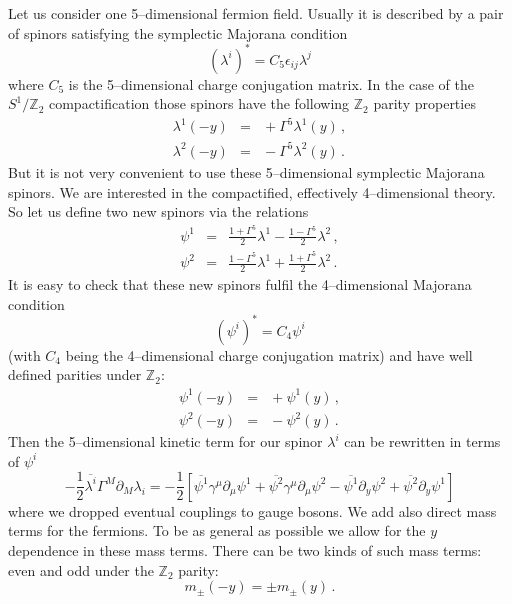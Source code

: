 \documentclass[a4paper,12pt]{article}
\def\pa{\partial}
\def\ga{\gamma}
\def\Ga{\Gamma}
\def\la{\lambda}
\def\eps{\epsilon}
\def\ZZ{\mathbb Z}
\begin{document}
Let us consider one 5--dimensional fermion field.
Usually it is described by a pair of spinors satisfying the symplectic
Majorana condition
\begin{equation}
(\la^i)^*=C_5\eps_{ij}\la^j
\end{equation}
where $C_5$ is the 5--dimensional charge conjugation matrix. In the
case of the $S^1/\ZZ_2$ compactification those spinors have the
following $\ZZ_2$ parity properties
\begin{eqnarray}
\la^1(-y)
\!\!\!&=&\!\!\!
+\Ga^5\la^1(y)
\,,\\[6pt]
\la^2(-y)
\!\!\!&=&\!\!\!
-\Ga^5\la^2(y)
\,.
\end{eqnarray}
But it is not very convenient to use these 5--dimensional symplectic
Majorana spinors. We are interested in the compactified, effectively
4--dimensional theory. So let us define two new spinors via the
relations
\begin{eqnarray}
\psi^1
\!\!\!&=&\!\!\!
\frac{1+\Ga^5}{2}\la^1 - \frac{1-\Ga^5}{2}\la^2
\,,\\[6pt]
\psi^2
\!\!\!&=&\!\!\!
\frac{1-\Ga^5}{2}\la^1 + \frac{1+\Ga^5}{2}\la^2
\,.
\end{eqnarray}
It is easy to check that these new spinors fulfil the 4--dimensional
Majorana condition
\begin{equation}
(\psi^i)^*=C_4\psi^i
\end{equation}
(with $C_4$ being the 4--dimensional charge conjugation matrix) and 
have well defined parities under $\ZZ_2$:
\begin{eqnarray}
\psi^1(-y)
\!\!\!&=&\!\!\!
+\psi^1(y)
\,,\label{psi1parity}
\\[6pt]
\psi^2(-y)
\!\!\!&=&\!\!\!
-\psi^2(y)
\,.\label{psi2parity}
\end{eqnarray}
Then the 5--dimensional kinetic term for our spinor $\la^i$ can be
rewritten in terms of $\psi^i$
\begin{equation}
-\frac12\overline{\la^i}\Ga^M\pa_M\la_i
=
-\frac12\left[
\overline{\psi^1}\ga^\mu\pa_\mu\psi^1
+\overline{\psi^2}\ga^\mu\pa_\mu\psi^2
-\overline{\psi^1}\pa_y\psi^2
+\overline{\psi^2}\pa_y\psi^1
\right]
\end{equation}
where we dropped eventual couplings to gauge bosons. We add also 
direct mass terms for the fermions. To be as general as possible we
allow for the $y$ dependence in these mass terms. There can be two
kinds of such mass terms: even and odd under the $\ZZ_2$ parity:
\begin{equation}
m_\pm(-y)=\pm m_\pm(y)
\,.
\end{equation}
\end{document}
